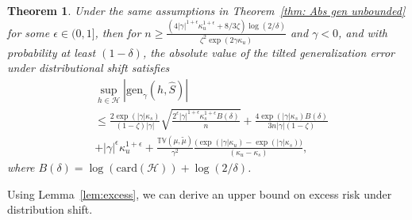 \documentclass{article}
\theoremstyle{plain}
\theoremstyle{plain}
\newtheorem{theorem}{Theorem}[section]
\newtheorem{proposition}[theorem]{Proposition}
\theoremstyle{definition}
\theoremstyle{remark}
\newcommand{\nn}{\nonumber}
\begin{document}
\begin{theorem}\label{thm:robust_uniform}
    Under the same assumptions in Theorem~\ref{thm: Abs gen unbounded} for some $\epsilon\in(0,1]$, then for $n\geq \frac{(4|\gamma|^{1+\epsilon}\kappa_u^{1+\epsilon}+8/3 \zeta )\log(2/\delta)}{\zeta^2\exp(2\gamma \kappa_u)}$ and $\gamma<0$, and with probability at least $(1-\delta)$, the absolute value of the tilted generalization error under distributional shift satisfies
    \begin{align}\label{eq:bound_robust}
            &\sup_{h\in\mathcal{H}}|\mathrm{gen}_{\gamma}(h,\hat{S})|\\\nn&\leq \frac{2\exp(|\gamma| \kappa_s)}{(1-\zeta)|\gamma|}\sqrt{\frac{2^{\epsilon}|\gamma|^{1+\epsilon}\kappa_s^{1+\epsilon}B(\delta)}{n}} +\frac{4\exp(|\gamma| \kappa_s)B(\delta)}{3n|\gamma|(1-\zeta)}\nn\\& \nn +|\gamma|^{\epsilon}\kappa_u^{1+\epsilon}+\frac{\mathbb{TV}(\mu,\tilde{\mu})}{\gamma^2 }\frac{\big(\exp(|\gamma|\kappa_u)-\exp(|\gamma|\kappa_s)\big)}{(\kappa_u-\kappa_s)},
        \end{align}
  where  $B(\delta)= \log(\mathrm{card}(\mathcal{H}))+\log(2/\delta)$.
\end{theorem}
Using Lemma~\ref{lem:excess}, we can derive an upper bound on excess risk under distribution shift.
\end{document}
